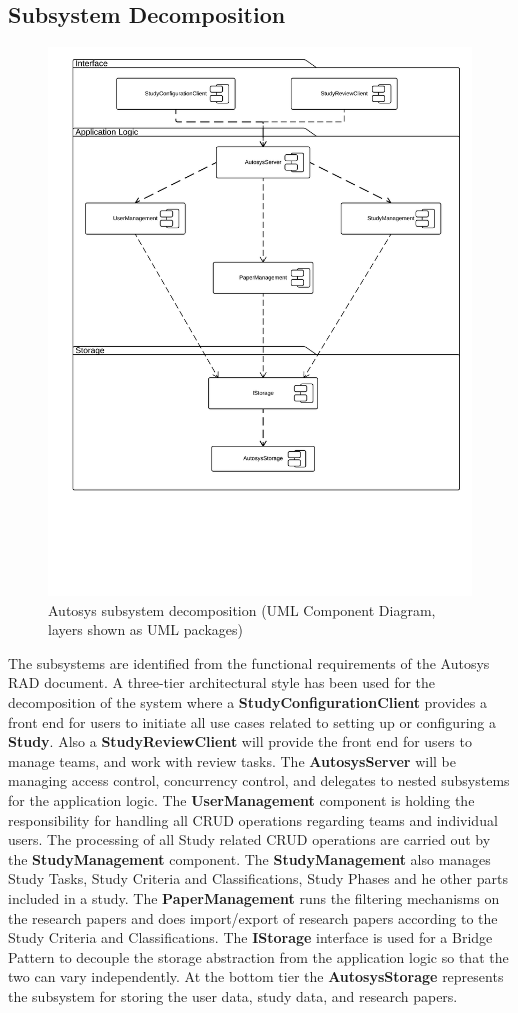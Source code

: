 \subsection{Subsystem Decomposition}
\begin{figure}[H]
	\includegraphics[width = \linewidth]{subsections/UMLComponentDiagramSubsystems}
	\caption{Autosys subsystem decomposition (UML Component Diagram, layers shown as UML packages)}
	\label{fig:Subsystem Decomposition, UML Component Diagram}
\end{figure}
The subsystems are identified from the functional requirements of the Autosys RAD document. A three-tier architectural style has been used for the decomposition of the system where a \textbf{StudyConfigurationClient} provides a front end for users to initiate all use cases related to setting up or configuring a \textbf{Study}. Also a \textbf{StudyReviewClient} will provide the front end for users to manage teams, and work with review tasks.
The \textbf{AutosysServer} will be managing access control, concurrency control, and delegates to nested subsystems for the application logic. The \textbf{UserManagement} component is holding the responsibility for handling all CRUD operations regarding teams and individual users. The processing of all Study related CRUD operations are carried out by the \textbf{StudyManagement} component. The  \textbf{StudyManagement} also manages Study Tasks, Study Criteria and Classifications, Study Phases and he other parts included in a study. The \textbf{PaperManagement} runs the filtering mechanisms on the research papers and does import/export of research papers according to the Study Criteria and Classifications.
The\textbf{ IStorage} interface is used for a Bridge Pattern to decouple the storage abstraction from the application logic so that the two can vary independently. At the bottom tier the \textbf{AutosysStorage} represents the subsystem for storing the user data, study data, and research papers.